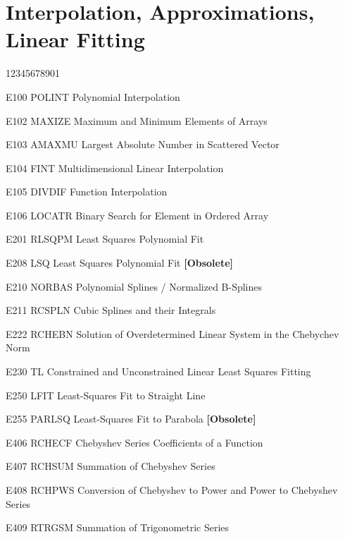 \section*{Interpolation, Approximations, Linear Fitting}
\begin{DLtt}{12345678901}
\item[E100 POLINT] Polynomial Interpolation
\item[E102 MAXIZE] Maximum and Minimum Elements of Arrays
\item[E103 AMAXMU] Largest Absolute Number in Scattered Vector
\item[E104 FINT] Multidimensional Linear Interpolation
\item[E105 DIVDIF] Function Interpolation
\item[E106 LOCATR] Binary Search for Element in Ordered Array
\item[E201 RLSQPM] Least Squares Polynomial Fit
\item[E208 LSQ] Least Squares Polynomial Fit {\bf [Obsolete]}
\item[E210 NORBAS] Polynomial Splines / Normalized B-Splines
\item[E211 RCSPLN] Cubic Splines and their Integrals
\item[E222 RCHEBN] Solution of Overdetermined Linear System in the
Chebychev Norm
\item[E230 TL] Constrained and Unconstrained Linear Least Squares Fitting
\item[E250 LFIT] Least-Squares Fit to Straight Line
\item[E255 PARLSQ] Least-Squares Fit to Parabola {\bf [Obsolete]}
\item[E406 RCHECF] Chebyshev Series Coefficients of a Function
\item[E407 RCHSUM] Summation of Chebyshev Series
\item[E408 RCHPWS] Conversion of Chebyshev to Power and Power to
Chebyshev Series
\item[E409 RTRGSM] Summation of Trigonometric Series
\end{DLtt}
